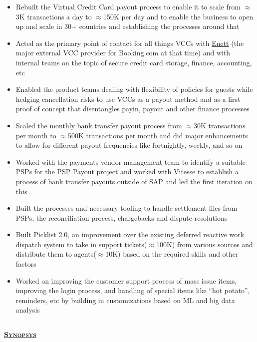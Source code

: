 \documentclass{article}
\begin{document}
\begin{itemize}[noitemsep,nolistsep]
\item Rebuilt the Virtual Credit Card payout process to enable it to scale from $\approx$3K transactions a day to $\approx$150K per day and to enable the business to open up and scale in 30+ countries and establishing the processes around that
\item Acted as the primary point of contact for all things VCCs with \href{https://www.enett.com/}{Enett} (the major external VCC provider for Booking.com at that time) and with internal teams on the topic of secure credit card storage, finance, accounting, etc
\item Enabled the product teams dealing with flexibility of policies for guests while hedging cancellation risks to use VCCs as a payout method and as a first proof of concept that disentangles payin, payout and other finance processes
\item Scaled the monthly bank transfer payout process from $\approx$30K transactions per month to $\approx$500K transactions per month and did major enhancements to allow for different payout frequencies like fortnightly, weekly, and so on
\item Worked with the payments vendor management team to identify a suitable PSPs for the PSP Payout project and worked with \href{https://vitessepsp.com/}{Vitesse} to establish a process of bank transfer payouts outside of SAP and led the first iteration on this
\item Built the processes and necessary tooling to handle settlement files from PSPs, the reconciliation process, chargebacks and dispute resolutions
\item Built Picklist 2.0, an improvement over the existing deferred reactive work dispatch system to take in support tickets($\approx$100K) from various sources and distribute them to agents($\approx$10K) based on the required skills and other factors
\item Worked on improving the customer support process of mass issue items, improving the login process, and handling of special items like “hot potato”, reminders, etc by building in customizations based on ML and big data analysis
\end{itemize}

\subsection[Synopsys]{}

{\raggedright{\textsc{\textbf{\href{https://www.synopsys.com/}{Synopsys}}}}} \hfill {}
\end{document}
